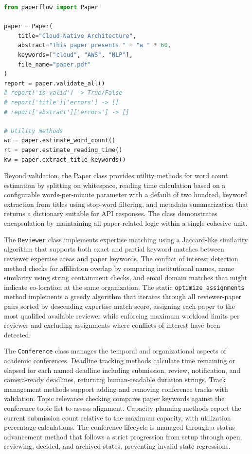 \documentclass[conference]{IEEEtran}
\begin{document}
\begin{lstlisting}[language=Python, caption={Paper validation with structured error reporting}]
from paperflow import Paper

paper = Paper(
    title="Cloud-Native Architecture",
    abstract="This paper presents " + "w " * 60,
    keywords=["cloud", "AWS", "NLP"],
    file_name="paper.pdf"
)
report = paper.validate_all()
# report['is_valid'] -> True/False
# report['title']['errors'] -> []
# report['abstract']['errors'] -> []

# Utility methods
wc = paper.estimate_word_count()
rt = paper.estimate_reading_time()
kw = paper.extract_title_keywords()
\end{lstlisting}

Beyond validation, the Paper class provides utility methods for word count estimation by splitting on whitespace, reading time calculation based on a configurable words-per-minute parameter with a default of two hundred, keyword extraction from titles using stop-word filtering, and metadata summarization that returns a dictionary suitable for API responses. The class demonstrates encapsulation by maintaining all paper-related logic within a single cohesive unit.

The \texttt{Reviewer} class implements expertise matching using a Jaccard-like similarity algorithm that supports both exact and partial keyword matches between reviewer expertise areas and paper keywords. The conflict of interest detection method checks for affiliation overlap by comparing institutional names, name similarity using string containment checks, and email domain matches that might indicate co-location at the same organization. The static \texttt{optimize\_assignments} method implements a greedy algorithm that iterates through all reviewer-paper pairs sorted by descending expertise match score, assigning each paper to the most qualified available reviewer while enforcing maximum workload limits per reviewer and excluding assignments where conflicts of interest have been detected.

The \texttt{Conference} class manages the temporal and organizational aspects of academic conferences. Deadline tracking methods calculate time remaining or elapsed for each named deadline including submission, review, notification, and camera-ready deadlines, returning human-readable duration strings. Track management methods support adding and removing conference tracks with validation. Topic relevance checking compares paper keywords against the conference topic list to assess alignment. Capacity planning methods report the current submission count relative to the maximum capacity, with utilization percentage calculations. The conference lifecycle is managed through a status advancement method that follows a strict progression from setup through open, reviewing, decided, and archived states, preventing invalid state regressions.
\end{document}
